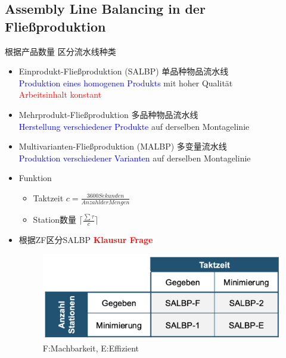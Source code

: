\documentclass[12pt, letterpaper]{article}
\begin{document}
\begin{CJK*}{UTF8}{gbsn}
\begin{itemize}
\begin{itemize}
\end{itemize}

\end{itemize}


\subsection{Assembly Line Balancing in der Fließproduktion}
根据产品数量 区分流水线种类
\begin{itemize}
\item Einprodukt-Fließproduktion (SALBP) 单品种物品流水线\\[1mm]
\textcolor{blue}{Produktion eines homogenen Produkts} mit hoher Qualität\\[1mm]
\textcolor{red}{Arbeitsinhalt konstant}

\item Mehrprodukt-Fließproduktion 多品种物品流水线\\[1mm]
\textcolor{blue}{Herstellung verschiedener Produkte} auf derselben Montagelinie

\item Multivarianten-Fließproduktion (MALBP) 多变量流水线\\[1mm]
\textcolor{blue}{Produktion verschiedener Varianten} auf derselben Montagelinie\\

\item Funktion 

\begin{itemize}
\item Taktzeit $c = \frac{3600 Sekunden}{Anzahl der Mengen}$ 
\item Station数量 $\lceil \frac{\sum \tau}{c} \rceil$
\end{itemize}

\newpage


\item 根据ZF区分SALBP \textbf{\textcolor{red}{Klausur Frage}}\\[1mm]
\begin{figure}[h!]
  \centering %
  \includegraphics[width=0.4\linewidth]{VL51.png}
  \caption*{F:Machbarkeit, E:Effizient} %
\end{figure}
 

\end{itemize}
\end{CJK*}
\end{document}
